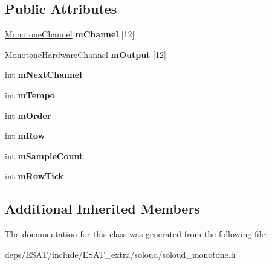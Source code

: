 \subsection*{Public Attributes}
\begin{DoxyCompactItemize}
\item 
\mbox{\label{class_so_loud_1_1_monotone_instance_aee1f7fef30f3e01220ab83e5fa4b180d}} 
\mbox{\hyperlink{struct_so_loud_1_1_monotone_channel}{Monotone\+Channel}} {\bfseries m\+Channel} \mbox{[}12\mbox{]}
\item 
\mbox{\label{class_so_loud_1_1_monotone_instance_adbd0e6190fa7dcc58ff274dd3c9ad140}} 
\mbox{\hyperlink{struct_so_loud_1_1_monotone_hardware_channel}{Monotone\+Hardware\+Channel}} {\bfseries m\+Output} \mbox{[}12\mbox{]}
\item 
\mbox{\label{class_so_loud_1_1_monotone_instance_a65539fbb341b2155d6f1436d72803a66}} 
int {\bfseries m\+Next\+Channel}
\item 
\mbox{\label{class_so_loud_1_1_monotone_instance_ab4153fbdbda4044eef0954f16ad3941f}} 
int {\bfseries m\+Tempo}
\item 
\mbox{\label{class_so_loud_1_1_monotone_instance_a8ff38937462eef3eb6ac406659d5265e}} 
int {\bfseries m\+Order}
\item 
\mbox{\label{class_so_loud_1_1_monotone_instance_abed652b9aada3dd2dc3bd3d570ab1fba}} 
int {\bfseries m\+Row}
\item 
\mbox{\label{class_so_loud_1_1_monotone_instance_a73cf22d769dc5ff543850b5913775c5b}} 
int {\bfseries m\+Sample\+Count}
\item 
\mbox{\label{class_so_loud_1_1_monotone_instance_ae9b7bff2b72639e579c154be1da031a2}} 
int {\bfseries m\+Row\+Tick}
\end{DoxyCompactItemize}
\subsection*{Additional Inherited Members}


The documentation for this class was generated from the following file\+:\begin{DoxyCompactItemize}
\item 
deps/\+E\+S\+A\+T/include/\+E\+S\+A\+T\+\_\+extra/soloud/soloud\+\_\+monotone.\+h\end{DoxyCompactItemize}
